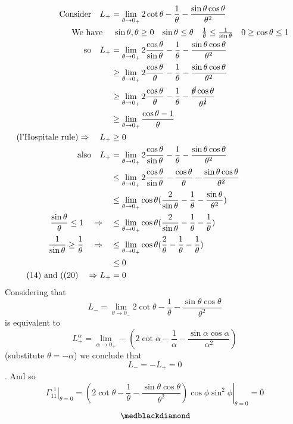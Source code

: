\begin{align}
\text{Consider}\quad L_{+}& = \lim_{\theta \to 0_{+}}2\cot\theta -\frac{1}{\theta}-\frac{\sin\theta\cos\theta}{\theta^2} \\
\text{We have}\quad &\begin{array}{lllll}
\sin\theta , \theta \ge 0&\sin\theta \leq \theta&\frac{1}{\theta}\leq \frac{1}{\sin \theta}& 0 \ge \cos \theta \leq 1\end{array}\\
\text{so} \quad L_{+}&= \lim_{\theta \to 0_{+}}2\frac{\cos\theta}{\sin\theta} -\frac{1}{\theta}-\frac{\sin\theta\cos\theta}{\theta^2} \\
\ &\geq \lim_{\theta \to 0_{+}}2\frac{\cos\theta}{\theta} -\frac{1}{\theta}-\frac{\sin\theta\cos\theta}{\theta^2} \\
\ &\geq \lim_{\theta \to 0_{+}}2\frac{\cos\theta}{\theta} -\frac{1}{\theta}-\frac{\cancel{\theta}\cos\theta}{\theta^{\cancel{2} }}\\
\ &\geq \lim_{\theta \to 0_{+}}\frac{\cos\theta-1}{\theta}\\
\text{(l'Hospitale rule)}\Rightarrow\quad L_{+}&\geq 0\\
\text{also} \quad L_{+}&= \lim_{\theta \to 0_{+}}2\frac{\cos\theta}{\sin\theta} -\frac{1}{\theta}-\frac{\sin\theta\cos\theta}{\theta^2} \\
\ &\leq \lim_{\theta \to 0_{+}}2\frac{\cos\theta}{\sin\theta} -\frac{\cos\theta}{\theta}-\frac{\sin\theta\cos\theta}{\theta^2} \\
\ &\leq \lim_{\theta \to 0_{+}}\cos\theta(\frac{2}{\sin\theta} -\frac{1}{\theta}-\frac{\sin\theta}{\theta^2})\\
\frac{\sin\theta}{\theta} \leq 1 \quad\Rightarrow\quad &\leq\lim_{\theta \to 0_{+}} \cos\theta(\frac{2}{\sin\theta} -\frac{1}{\theta}-\frac{1}{\theta})\\
\frac{1}{\sin\theta} \geq \frac{1}{\theta} \quad\Rightarrow\quad &\leq\lim_{\theta \to 0_{+}} \cos\theta(\frac{2}{\theta} -\frac{1}{\theta}-\frac{1}{\theta})\\
\ & \leq 0\\
\text{(14) and ((20)}\quad \Rightarrow L_{+}& =0
\end{align} 
Considering that $$L_{-} = \lim_{\theta \to 0_{-}}2\cot\theta -\frac{1}{\theta}-\frac{\sin\theta\cos\theta}{\theta^2}$$ is equivalent to  $$L_{+}^{\alpha} = \lim_{\alpha \to 0_{+}}-(2\cot\alpha -\frac{1}{\alpha}-\frac{\sin\alpha\cos\alpha}{\alpha^2})$$ (substitute $\theta = -\alpha$) we conclude that   $$L_{-} =  -L_{+}=0$$. And so $$\left.\Gamma_{11}^{,1}\right|_{\theta=0} =\left.(2\cot\theta -\frac{1}{\theta}-\frac{\sin\theta\cos\theta}{\theta^2})\cos\phi\sin^2\phi\right|_{\theta=0} = 0$$
$$\medblackdiamond$$
\newpage